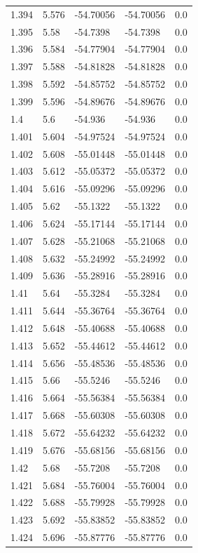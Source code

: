 \begin{tabular}{lllll}
1.394 & 5.576 & -54.70056 & -54.70056 & 0.0 \\
1.395 & 5.58 & -54.7398 & -54.7398 & 0.0 \\
1.396 & 5.584 & -54.77904 & -54.77904 & 0.0 \\
1.397 & 5.588 & -54.81828 & -54.81828 & 0.0 \\
1.398 & 5.592 & -54.85752 & -54.85752 & 0.0 \\
1.399 & 5.596 & -54.89676 & -54.89676 & 0.0 \\
1.4 & 5.6 & -54.936 & -54.936 & 0.0 \\
1.401 & 5.604 & -54.97524 & -54.97524 & 0.0 \\
1.402 & 5.608 & -55.01448 & -55.01448 & 0.0 \\
1.403 & 5.612 & -55.05372 & -55.05372 & 0.0 \\
1.404 & 5.616 & -55.09296 & -55.09296 & 0.0 \\
1.405 & 5.62 & -55.1322 & -55.1322 & 0.0 \\
1.406 & 5.624 & -55.17144 & -55.17144 & 0.0 \\
1.407 & 5.628 & -55.21068 & -55.21068 & 0.0 \\
1.408 & 5.632 & -55.24992 & -55.24992 & 0.0 \\
1.409 & 5.636 & -55.28916 & -55.28916 & 0.0 \\
1.41 & 5.64 & -55.3284 & -55.3284 & 0.0 \\
1.411 & 5.644 & -55.36764 & -55.36764 & 0.0 \\
1.412 & 5.648 & -55.40688 & -55.40688 & 0.0 \\
1.413 & 5.652 & -55.44612 & -55.44612 & 0.0 \\
1.414 & 5.656 & -55.48536 & -55.48536 & 0.0 \\
1.415 & 5.66 & -55.5246 & -55.5246 & 0.0 \\
1.416 & 5.664 & -55.56384 & -55.56384 & 0.0 \\
1.417 & 5.668 & -55.60308 & -55.60308 & 0.0 \\
1.418 & 5.672 & -55.64232 & -55.64232 & 0.0 \\
1.419 & 5.676 & -55.68156 & -55.68156 & 0.0 \\
1.42 & 5.68 & -55.7208 & -55.7208 & 0.0 \\
1.421 & 5.684 & -55.76004 & -55.76004 & 0.0 \\
1.422 & 5.688 & -55.79928 & -55.79928 & 0.0 \\
1.423 & 5.692 & -55.83852 & -55.83852 & 0.0 \\
1.424 & 5.696 & -55.87776 & -55.87776 & 0.0 \\

\end{tabular}
